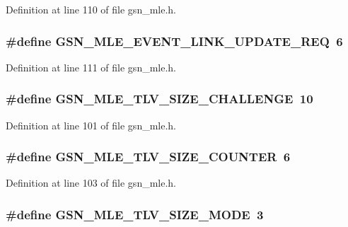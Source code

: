 Definition at line 110 of file gsn\_\-mle.h.

\hypertarget{a00527_aa738d58de196cd03657a3193efc846b7}{
\subsubsection[{GSN\_\-MLE\_\-EVENT\_\-LINK\_\-UPDATE\_\-REQ}]{\setlength{\rightskip}{0pt plus 5cm}\#define GSN\_\-MLE\_\-EVENT\_\-LINK\_\-UPDATE\_\-REQ~6}}
\label{a00527_aa738d58de196cd03657a3193efc846b7}


Definition at line 111 of file gsn\_\-mle.h.

\hypertarget{a00527_a6f5411146a7b138bc901675418aba601}{
\subsubsection[{GSN\_\-MLE\_\-TLV\_\-SIZE\_\-CHALLENGE}]{\setlength{\rightskip}{0pt plus 5cm}\#define GSN\_\-MLE\_\-TLV\_\-SIZE\_\-CHALLENGE~10}}
\label{a00527_a6f5411146a7b138bc901675418aba601}


Definition at line 101 of file gsn\_\-mle.h.

\hypertarget{a00527_aee3b5193bb4624951bb8bde1d0ab10f2}{
\subsubsection[{GSN\_\-MLE\_\-TLV\_\-SIZE\_\-COUNTER}]{\setlength{\rightskip}{0pt plus 5cm}\#define GSN\_\-MLE\_\-TLV\_\-SIZE\_\-COUNTER~6}}
\label{a00527_aee3b5193bb4624951bb8bde1d0ab10f2}


Definition at line 103 of file gsn\_\-mle.h.

\hypertarget{a00527_a92a27696a98909cc234a479caf893b25}{
\subsubsection[{GSN\_\-MLE\_\-TLV\_\-SIZE\_\-MODE}]{\setlength{\rightskip}{0pt plus 5cm}\#define GSN\_\-MLE\_\-TLV\_\-SIZE\_\-MODE~3}}
\label{a00527_a92a27696a98909cc234a479caf893b25}


